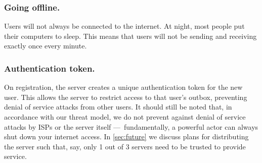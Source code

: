 

\subsubsection{Going offline.} Users will not always be connected to the internet. At night, most people put their computers to sleep. This means that users will not be sending and receiving exactly once every minute.  

\subsubsection{Authentication token.} 
On registration, the server creates a unique authentication token for the new user. This allows the server to restrict access to that user's outbox, preventing denial of service attacks from other users. It should still be noted that, in accordance with our threat model, we do not prevent against denial of service attacks by ISPs or the server itself — fundamentally, a powerful actor can always shut down your internet access. In \cref{sec:future} we discuss plans for distributing the server such that, say, only 1 out of 3 servers need to be trusted to provide service.

